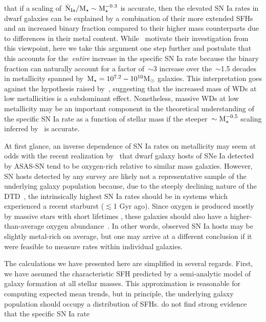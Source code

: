 \documentclass[ms.tex]{subfiles}
\begin{document}
that if a scaling of~$\dot{\text{N}}_\text{Ia} / \text{M}_\star \sim \text{M}_\star^{-0.3}$ is
accurate, then the elevated SN Ia rates in dwarf galaxies can be explained by a
combination of their more extended SFHs and an increased binary fraction
compared to their higher mass counterparts due to differences in their metal
content.
While~\citet{Gandhi2022} motivate their investigation from this viewpoint, here
we take this argument one step further and postulate that this accounts for
the~\textit{entire} increase in the specific SN Ia rate because the binary
fraction can naturally account for a factor of~$\sim$3 increase over
the~$\sim$1.5 decades in metallicity spanned by~$\text{M}_\star = 10^{7.2} - 10^{10}
\text{M}_\odot$ galaxies.
This interpretation goes against the hypothesis raised by~\citet{Kistler2013},
suggesting that the increased mass of WDs at low metallicities is a subdominant
effect.
Nonetheless, massive WDs at low metallicity may be an important component in
the theoretical understanding of the specific SN Ia rate as a function of
stellar mass if the steeper~$\sim \text{M}_\star^{-0.5}$ scaling inferred
by~\citet{Brown2019} is accurate.
\par
At first glance, an inverse dependence of SN Ia rates on metallicity may seem
at odds with the recent realization by~\citet{Holoien2022} that dwarf galaxy
hosts of SNe Ia detected by ASAS-SN tend to be oxygen-rich relative to similar
mass galaxies.
However, SN hosts detected by any survey are likely not a representative sample
of the underlying galaxy population because, due to the steeply declining
nature of the DTD~\citep[e.g.,][]{Maoz2012a}, the intrinsically highest SN Ia
rates should be in systems which experienced a recent starburst ($\lesssim$1
Gyr ago).
Since oxygen is produced mostly by massive stars with short lifetimes
\citep*[e.g.,][]{Hurley2000, Johnson2019}, these galaxies should also have a
higher-than-average oxygen abundance~\citep[e.g.,][]{Johnson2020}.
In other words, observed SN Ia hosts may be slightly metal-rich on average, but
one may arrive at a different conclusion if it were feasible to measure rates
within individual galaxies.
\par
The calculations we have presented here are simplified in several regards.
First, we have assumed the characteristic SFH predicted by a semi-analytic
model of galaxy formation at all stellar masses.
This approximation is reasonable for computing expected mean trends, but in
principle, the underlying galaxy population should occupy a distribution of
SFHs.
\citet{Brown2019} do not find strong evidence that the specific SN Ia rate
\end{document}
